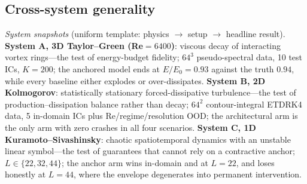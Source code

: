 \documentclass[11pt,a4paper]{article}
\begin{document}
\subsection{Cross-system generality}\label{sec:ood}

\emph{System snapshots} (uniform template: physics $\to$ setup $\to$ headline result). \textbf{System A, 3D Taylor--Green (Re$=6400$)}: viscous decay of interacting vortex rings---the test of energy-budget fidelity; $64^3$ pseudo-spectral data, 10 test ICs, $K{=}200$; the anchored model ends at $E/E_0{=}0.93$ against the truth $0.94$, while every baseline either explodes or over-dissipates. \textbf{System B, 2D Kolmogorov}: statistically stationary forced-dissipative turbulence---the test of production--dissipation balance rather than decay; $64^2$ contour-integral ETDRK4 data, 5 in-domain ICs plus Re/regime/resolution OOD; the architectural arm is the only arm with zero crashes in all four scenarios. \textbf{System C, 1D Kuramoto--Sivashinsky}: chaotic spatiotemporal dynamics with an unstable linear symbol---the test of guarantees that cannot rely on a contractive anchor; $L\in\{22,32,44\}$; the anchor arm wins in-domain and at $L{=}22$, and loses honestly at $L{=}44$, where the envelope degenerates into permanent intervention.
\end{document}
